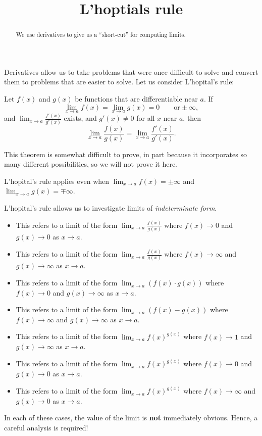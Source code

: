 \documentclass{ximera}
\title[Dig-In:]{L'hoptials rule}
\begin{document}
\begin{abstract}
  We use derivatives to give us a ``short-cut'' for computing limits.
\end{abstract}
\maketitle

Derivatives allow us to take problems that were once difficult to
solve and convert them to problems that are easier to solve. Let us
consider L'hopital's rule:

\begin{theorem} 
Let $f(x)$ and $g(x)$ be functions that are differentiable near $a$.  If
\[
\lim_{x \to a} f(x) = \lim_{x \to a}g(x) = 0 \qquad \text{or} \pm \infty,
\]
and $\lim_{x \to a} \frac{f'(x)}{g'(x)}$ exists, and $g'(x) \neq 0$
for all $x$ near $a$, then 
\[
\lim_{x \to a} \frac{f(x)}{g(x)} = \lim_{x \to a} \frac{f'(x)}{g'(x)}.
\]
\end{theorem}

This theorem is somewhat difficult to prove, in part because it
incorporates so many different possibilities, so we will not prove it
here. 
\begin{remark}
  L'hopital's rule applies even when $\lim_{x\to a}f(x) = \pm \infty$
  and $\lim_{x\to a}g(x) = \mp \infty$.
\end{remark}


L'hopital's rule allows us to investigate limits of
\textit{indeterminate form}.

\begin{definition}\hfil
\begin{itemize}
\item[\zeroOverZero] This refers to a limit of the form $\lim_{x\to a}
  \frac{f(x)}{g(x)}$ where $f(x)\to 0$ and $g(x)\to 0$ as $x\to a$.
\item[\inftyOverInfty] This refers to a limit of the form $\lim_{x\to a}
  \frac{f(x)}{g(x)}$ where $f(x)\to \infty$ and $g(x)\to \infty$ as $x\to a$.
\item[\zeroOverInfty] This refers to a limit of the form $\lim_{x\to a}
  \left(f(x)\cdot g(x)\right)$ where $f(x)\to 0$ and $g(x)\to \infty$ as $x\to a$.
\item[\inftyMinusInfty] This refers to a limit of the form $\lim_{x\to a}\left(
  f(x)-g(x)\right)$ where $f(x)\to \infty$ and $g(x)\to \infty$ as $x\to a$.
\item[\oneToInfty] This refers to a limit of the form $\lim_{x\to a}
  f(x)^{g(x)}$ where $f(x)\to 1$ and $g(x)\to \infty$ as $x\to a$.
\item[\zeroToZero] This refers to a limit of the form $\lim_{x\to a}
  f(x)^{g(x)}$ where $f(x)\to 0$ and $g(x)\to 0$ as $x\to a$.
\item[\inftyToZero] This refers to a limit of the form $\lim_{x\to a}
  f(x)^{g(x)}$ where $f(x)\to \infty$ and $g(x)\to 0$ as $x\to a$.
\end{itemize}
In each of these cases, the value of the limit is \textbf{not} immediately
obvious. Hence, a careful analysis is required!
\end{definition}
\end{document}
